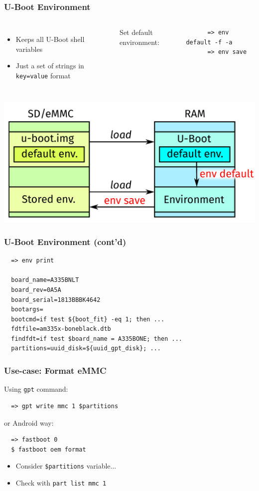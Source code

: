 \begin{frame}[fragile]
  \frametitle{U-Boot Environment}
  \begin{columns}
      \begin{itemize}
      \item Keeps all U-Boot shell variables
      \item Just a set of strings in \texttt{key=value} format
      \end{itemize}
    \pause
      Set default environment:
      \begin{verbatim}
      => env default -f -a
      => env save
      \end{verbatim}
     \vspace*{-14mm} %
  \end{columns}
  \pause
  \bigskip
  \begin{center}
  \includegraphics[scale=0.33]{images/env.pdf}
  \end{center}
\end{frame}

\begin{frame}[fragile]
  \frametitle{U-Boot Environment (cont'd)}
  \begin{verbatim}
  => env print

  board_name=A335BNLT
  board_rev=0A5A
  board_serial=1813BBBK4642
  bootargs=
  bootcmd=if test ${boot_fit} -eq 1; then ...
  fdtfile=am335x-boneblack.dtb
  findfdt=if test $board_name = A335BONE; then ...
  partitions=uuid_disk=${uuid_gpt_disk}; ...
  \end{verbatim}
\end{frame}

\begin{frame}[fragile]
  \frametitle{Use-case: Format eMMC}
  Using \texttt{gpt} command:
  \begin{verbatim}
  => gpt write mmc 1 $partitions
  \end{verbatim}
  \pause
  or Android way:
  \begin{verbatim}
  => fastboot 0
  $ fastboot oem format
  \end{verbatim}
  \pause
  \begin{itemize}
  \item Consider \alert{\texttt{\$partitions}} variable...
  \item Check with \texttt{part list mmc 1}
  \end{itemize}
\end{frame}

